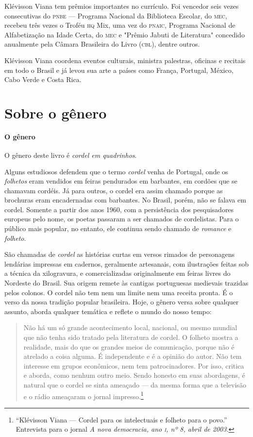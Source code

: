 \documentclass[11pt]{extarticle}
\begin{document}
Klévisson Viana tem prêmios importantes no currículo. Foi vencedor seis vezes consecutivas do 
\textsc{pnbe} --- Programa Nacional da Biblioteca Escolar, do \textsc{mec}, recebeu três 
vezes o Troféu \textsc{hq} Mix, uma vez do \textsc{pnaic}, Programa Nacional de Alfabetização 
na Idade Certa, do \textsc{mec} e "Prêmio Jabuti de Literatura" concedido anualmente pela 
Câmara Brasileira do Livro (\textsc{cbl}), dentre outros. 

Klévisson Viana coordena eventos culturais, ministra palestras, oficinas e recitais em 
todo o Brasil e já levou sua arte a países como França, Portugal, México, Cabo Verde e Costa Rica. 


\section{Sobre o gênero}

\paragraph{O gênero} O gênero deste livro é \textit{cordel em quadrinhos}. 


Alguns estudiosos defendem que o termo \textit{cordel} venha de Portugal, onde os \textit{folhetos} 
eram vendidos em feiras pendurados em barbantes, em cordões que se chamavam cordéis. Já para
outros, o cordel era assim chamado porque as brochuras eram encadernadas com barbantes. 
No Brasil, porém, não se falava em cordel. Somente a partir dos anos 1960, com a persistência 
dos pesquisadores europeus pelo nome, os poetas passaram a ser chamados de 
cordelistas. Para o público mais popular, no entanto, ele continua sendo chamado de \textit{romance} e 
\textit{folheto}.

São chamadas de \textit{cordel} as histórias curtas em versos rimados de personagens 
lendárias impressas em cadernos, geralmente artesanais, com ilustrações feitas sob a técnica da 
xilogravura, e comercializadas originalmente em feiras livres do Nordeste do Brasil. 
Sua origem remete às cantigas portuguesas medievais trazidas pelos colonos.
O cordel não tem nem um limite nem uma receita pronta. É o verso da 
nossa tradição popular brasileira. Hoje, o gênero versa sobre qualquer 
assunto, aborda qualquer temática e reflete o mundo do nosso tempo:

\begin{quote}
Não há um só grande acontecimento local, nacional, ou mesmo mundial que não tenha sido tratado 
pela literatura de cordel. O folheto mostra a realidade, mais do que os grandes meios de comunicação, 
porque não é atrelado a coisa alguma. É independente e é a opinião do autor. Não tem interesse em 
grupos econômicos, nem tem patrocinadores. Por isso, critica e aborda, como nenhum outro meio. 
Sendo honesto em suas abordagens, é natural que o cordel se sinta ameaçado --- da mesma forma que 
a televisão e o rádio ameaçaram o jornal impresso.\footnote{``Klévisson Viana --- Cordel para os intelectuais e folheto para o povo.'' Entrevista para o jornal \textit{A nova democracia, ano \textsc{i}, nº 8, abril de 2003.}}
\end{quote}
\end{document}
